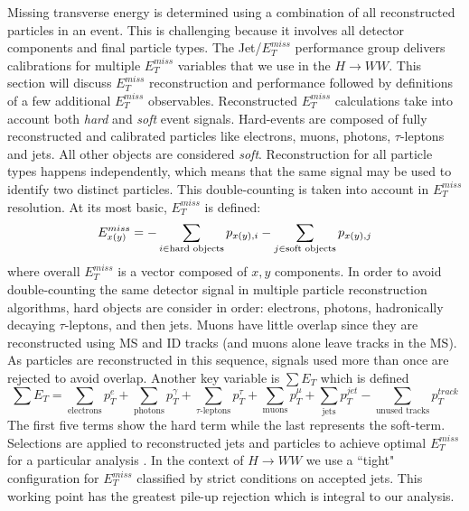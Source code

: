 Missing transverse energy is determined using a combination of all reconstructed particles in an event. This is challenging because it involves all detector components and final particle types. The Jet/$E_T^{miss}$ performance group delivers calibrations for multiple $E_T^{miss}$ variables that we use in the $H\rightarrow WW$. This section will discuss $E_T^{miss}$ reconstruction and performance followed by definitions of a few additional $E_T^{miss}$ observables. 
Reconstructed $E_T^{miss}$ calculations take into account both \textit{hard} and \textit{soft} event signals. Hard-events are composed of fully reconstructed and calibrated particles like electrons, muons, photons, $\tau$-leptons and jets. All other objects are considered \textit{soft}. Reconstruction for all particle types happens independently, which means that the same signal may be used to identify two distinct particles. This double-counting is taken into account in $E_T^{miss}$ resolution. At its most basic, $E_T^{miss}$ is defined:
\begin{equation}
E_{x(y)}^{miss}=-\sum_{i\in{\textnormal{hard objects}}}p_{x(y),i} -\sum_{j\in{\textnormal{soft objects}}}p_{x(y),j}
\end{equation}
where overall $E_T^{miss}$ is a vector composed of $x,y$ components. In order to avoid double-counting the same detector signal in multiple particle reconstruction algorithms, hard objects are consider in order: electrons, photons, hadronically decaying $\tau$-leptons, and then jets. Muons have little overlap since they are reconstructed using MS and ID tracks (and muons alone leave tracks in the MS). As particles are reconstructed in this sequence, signals used more than once are rejected to avoid overlap. Another key variable is $\sum E_T$ which is defined
\begin{equation}
\sum E_T = \sum_{\text{electrons}} p_T^e + \sum_{\text{photons}} p_T^\gamma + \sum_{\text{$\tau$-leptons}} p_T^\tau + \sum_{\text{muons}} p_T^\mu + \sum_{\text{jets}} p_T^{jet} - \sum_{\text{unused tracks}} p_T^{track}
\end{equation}
The first five terms show the hard term while the last represents the soft-term. Selections are applied to reconstructed jets and particles to achieve optimal $E_T^{miss}$ for a particular analysis \cite{METPerf}. In the context of $H\rightarrow WW$ we use a ``tight" configuration for $E_T^{miss}$ classified by strict conditions on accepted jets. This working point has the greatest pile-up rejection which is integral to our analysis. 

